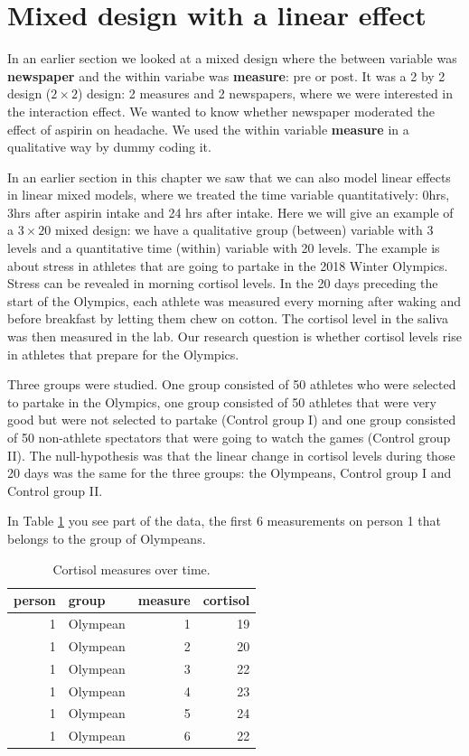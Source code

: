 \documentclass[]{book}\usepackage[]{graphicx}\usepackage[]{color}
\begin{document}
\section{Mixed design with a linear effect}

In an earlier section we looked at a mixed design where the between variable was \textbf{newspaper} and the within variabe was \textbf{measure}: pre or post. It was a 2 by 2 design ($2 \times 2$) design: 2 measures and 2 newspapers, where we were interested in the interaction effect. We wanted to know whether newspaper moderated the effect of aspirin on headache. We used the within variable \textbf{measure} in a qualitative way by dummy coding it. 

In an earlier section in this chapter we saw that we can also model linear effects in linear mixed models, where we treated the time variable quantitatively: 0hrs, 3hrs after aspirin intake and 24 hrs after intake. Here we will give an example of a $3 \times 20$ mixed design: we have a qualitative group (between) variable with 3 levels and a quantitative time (within) variable with 20 levels. The example is about stress in athletes that are going to partake in the 2018 Winter Olympics. Stress can be revealed in morning cortisol levels. In the 20 days preceding the start of the Olympics, each athlete was measured every morning after waking and before breakfast by letting them chew on cotton. The cortisol level in the saliva was then measured in the lab. Our research question is whether cortisol levels rise in athletes that prepare for the Olympics.

Three groups were studied. One group consisted of 50 athletes who were selected to partake in the Olympics, one group consisted of 50 athletes that were very good but were not selected to partake (Control group I) and one group consisted of 50 non-athlete spectators that were going to watch the games (Control group II). The null-hypothesis was that the linear change in cortisol levels during those 20 days was the same for the three groups: the Olympeans, Control group I and Control group II. 

In Table \ref{tab:analysismixed20_1} you see part of the data, the first 6 measurements on person 1 that belongs to the group of Olympeans.

\begin{table}[ht]
\centering
\caption{Cortisol measures over time.} 
\label{tab:analysismixed20_1}
\begin{tabular}{rlrr}
  \hline
person & group & measure & cortisol \\ 
  \hline
1 & Olympean & 1 & 19 \\ 
  1 & Olympean & 2 & 20 \\ 
  1 & Olympean & 3 & 22 \\ 
  1 & Olympean & 4 & 23 \\ 
  1 & Olympean & 5 & 24 \\ 
  1 & Olympean & 6 & 22 \\ 
   \hline
\end{tabular}
\end{table}
\end{document}
